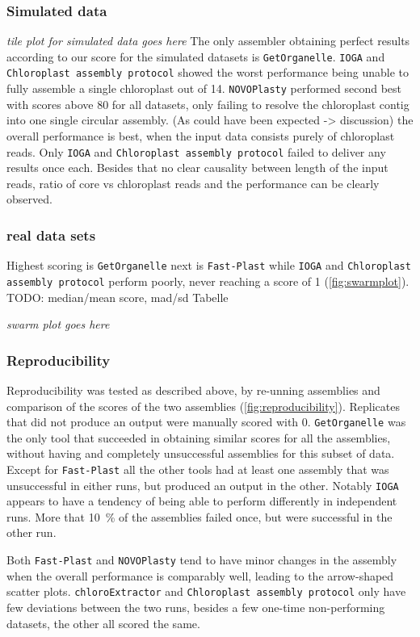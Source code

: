 \documentclass{bmcart}
\newcommand{\formatprogramnames}[1]{\texttt{#1}}
\newcommand{\ce}{\formatprogramnames{chloroExtractor}}
\newcommand{\fp}{\formatprogramnames{Fast-Plast}}
\newcommand{\ioga}{\formatprogramnames{IOGA}}
\newcommand{\np}{\formatprogramnames{NOVOPlasty}}
\newcommand{\go}{\formatprogramnames{GetOrganelle}}
\newcommand{\cassp}{\formatprogramnames{Chloroplast assembly protocol}}
\begin{document}
\subsubsection*{Simulated data}
\textit{tile plot for simulated data goes here}
The only assembler obtaining perfect results according to our score for the simulated datasets is \go{}.
\ioga{} and \cassp{} showed the worst performance being unable to fully assemble a single chloroplast out of \num{14}.
\np{} performed second best with scores above \num{80} for all datasets, only failing to resolve the chloroplast contig into one single circular assembly.
(As could have been expected -> discussion) the overall performance is best, when the input data consists purely of chloroplast reads.
Only \ioga{} and \cassp{} failed to deliver any results once each.
Besides that no clear causality between length of the input reads, ratio of core vs chloroplast reads and the performance can be clearly observed. 

\subsubsection*{real data sets}
Highest scoring is \go{} next is \fp{} while \ioga{} and \cassp{} perform poorly, never reaching a score of  \num{1} (\cref{fig:swarmplot}). TODO: median/mean score, mad/sd Tabelle

\textit{swarm plot goes here}


\subsubsection*{Reproducibility}
Reproducibility was tested as described above, by re-unning assemblies and comparison of the scores of the two assemblies (\cref{fig:reproducibility}).
Replicates that did not produce an output were manually scored with \num{0}. 
\go{} was the only tool that succeeded in obtaining similar scores for all the assemblies, without having and completely unsuccessful assemblies for this subset of data. Except for \fp{} all the other tools had at least one assembly that was unsuccessful in either runs, but produced an output in the other.  Notably \ioga{} appears to have a tendency of being able to perform differently in independent runs. More that \SI{10}{\percent} of the assemblies failed once, but were successful in the other run.

Both \fp{} and \np{} tend to have minor changes in the assembly when the overall performance is comparably well, leading to the arrow-shaped scatter plots. \ce{} and \cassp{} only have few deviations between the two runs, besides a few one-time non-performing datasets, the other all scored the same.
\end{document}
